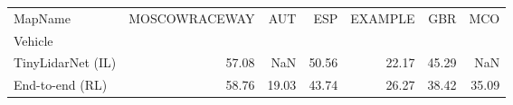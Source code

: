 \begin{tabular}{lrrrrrr}
\toprule
MapName & MOSCOWRACEWAY & AUT & ESP & EXAMPLE & GBR & MCO \\
Vehicle &  &  &  &  &  &  \\
\midrule
TinyLidarNet (IL) & 57.08 & NaN & 50.56 & 22.17 & 45.29 & NaN \\
End-to-end (RL) & 58.76 & 19.03 & 43.74 & 26.27 & 38.42 & 35.09 \\
\bottomrule
\end{tabular}
